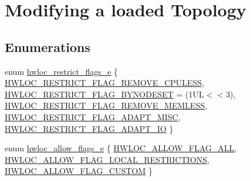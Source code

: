 \hypertarget{a00194}{}\section{Modifying a loaded Topology}
\label{a00194}
\subsection*{Enumerations}
\begin{DoxyCompactItemize}
\item 
enum \hyperlink{a00194_ga9d80f08eb25b7ac22f1b998dc8bf521f}{hwloc\+\_\+restrict\+\_\+flags\+\_\+e} \{ \newline
\hyperlink{a00194_gga9d80f08eb25b7ac22f1b998dc8bf521fa80eeb9cbba401ab050f8fb4573725891}{H\+W\+L\+O\+C\+\_\+\+R\+E\+S\+T\+R\+I\+C\+T\+\_\+\+F\+L\+A\+G\+\_\+\+R\+E\+M\+O\+V\+E\+\_\+\+C\+P\+U\+L\+E\+SS}, 
\hyperlink{a00194_gga9d80f08eb25b7ac22f1b998dc8bf521fae4c5b1b87232f2d8a60559e77ac65a68}{H\+W\+L\+O\+C\+\_\+\+R\+E\+S\+T\+R\+I\+C\+T\+\_\+\+F\+L\+A\+G\+\_\+\+B\+Y\+N\+O\+D\+E\+S\+ET} = (1\+UL$<$$<$3), 
\hyperlink{a00194_gga9d80f08eb25b7ac22f1b998dc8bf521faf5ba49808855704bfe9cb9fe7347f93b}{H\+W\+L\+O\+C\+\_\+\+R\+E\+S\+T\+R\+I\+C\+T\+\_\+\+F\+L\+A\+G\+\_\+\+R\+E\+M\+O\+V\+E\+\_\+\+M\+E\+M\+L\+E\+SS}, 
\hyperlink{a00194_gga9d80f08eb25b7ac22f1b998dc8bf521fa699969227a09bbc1a7de51dc9fb7be4b}{H\+W\+L\+O\+C\+\_\+\+R\+E\+S\+T\+R\+I\+C\+T\+\_\+\+F\+L\+A\+G\+\_\+\+A\+D\+A\+P\+T\+\_\+\+M\+I\+SC}, 
\newline
\hyperlink{a00194_gga9d80f08eb25b7ac22f1b998dc8bf521faa95d6985e36ec1e55f68b210297a85cb}{H\+W\+L\+O\+C\+\_\+\+R\+E\+S\+T\+R\+I\+C\+T\+\_\+\+F\+L\+A\+G\+\_\+\+A\+D\+A\+P\+T\+\_\+\+IO}
 \}
\item 
enum \hyperlink{a00194_ga38b1be3922094d880f6e76bf56c973d6}{hwloc\+\_\+allow\+\_\+flags\+\_\+e} \{ \hyperlink{a00194_gga38b1be3922094d880f6e76bf56c973d6aca107692455774f9d323d21b8abfce72}{H\+W\+L\+O\+C\+\_\+\+A\+L\+L\+O\+W\+\_\+\+F\+L\+A\+G\+\_\+\+A\+LL}, 
\hyperlink{a00194_gga38b1be3922094d880f6e76bf56c973d6a88c50088c09dcf1e1a496c0817556fb9}{H\+W\+L\+O\+C\+\_\+\+A\+L\+L\+O\+W\+\_\+\+F\+L\+A\+G\+\_\+\+L\+O\+C\+A\+L\+\_\+\+R\+E\+S\+T\+R\+I\+C\+T\+I\+O\+NS}, 
\hyperlink{a00194_gga38b1be3922094d880f6e76bf56c973d6a489c8c1b67ce7e0b8cf7a665852760e1}{H\+W\+L\+O\+C\+\_\+\+A\+L\+L\+O\+W\+\_\+\+F\+L\+A\+G\+\_\+\+C\+U\+S\+T\+OM}
 \}
\end{DoxyCompactItemize}
